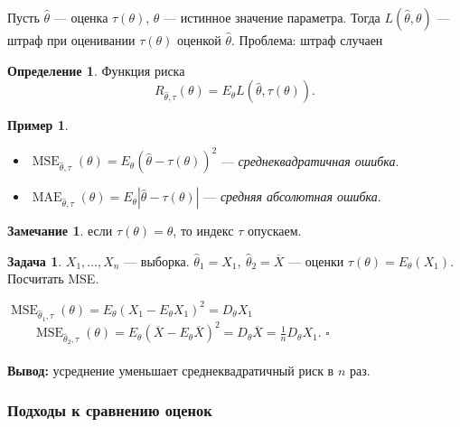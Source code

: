 \documentclass[12pt]{report}
\newenvironment{solution}{{\bfseries Решение:}}{$\square$\\\\}
\theoremstyle{definition}
\newtheorem{definition}{Определение}
\newtheorem{example}{Пример}
\newtheorem{problem}{Задача}
\newtheorem{remark}{Замечание}
\begin{document}
Пусть $\widehat{\theta}$ — оценка $\tau(\theta)$, $\theta$ — истинное значение параметра. Тогда $L(\widehat{\theta}, \theta)$ — штраф при оценивании $\tau(\theta)$ оценкой $\widehat\theta$.  
Проблема: штраф случаен

\begin{definition}
	Функция риска
	$$R_{\widehat\theta, \tau}(\theta) = E_\theta L(\widehat\theta, \tau(\theta)).$$
\end{definition}
\begin{example}
	$\;$
	\begin{itemize}
		\item $\operatorname{MSE}_{\widehat{\theta}, \tau}(\theta) = E_\theta(\widehat{\theta} - \tau(\theta))^2$ — \emph{среднеквадратичная ошибка}.
		\item $\operatorname{MAE}_{\widehat{\theta}, \tau}(\theta) = E_\theta|\widehat{\theta} - \tau(\theta)|$ — \emph{средняя абсолютная ошибка}.
	\end{itemize}
\end{example}
\begin{remark}
	если $\tau(\theta) = \theta$, то индекс $\tau$ опускаем.
\end{remark}
\begin{problem}
	$X_1, \dots, X_n$ — выборка. $\widehat{\theta}_1 = X_1, \ \widehat{\theta}_2 = \overline{X}$ — оценки $\tau(\theta) = E_\theta(X_1)$. Посчитать MSE.  
\end{problem}
\begin{solution}
	$ \operatorname{MSE}_{\widehat{\theta}_1, \tau}(\theta) = E_\theta(X_1 - E_\theta X_1)^2 = D_\theta X_1$  
$\qquad \operatorname{MSE}_{\widehat{\theta}_2, \tau}(\theta) = E_\theta(\overline{X} - E_\theta \overline{X})^2 = D_\theta \overline{X} = \frac{1}{n}D_\theta X_1.$  
\end{solution}
\textbf{Вывод:} усреднение уменьшает среднеквадратичный риск в $n$ раз.

\subsubsection{Подходы к сравнению оценок}
\end{document}
